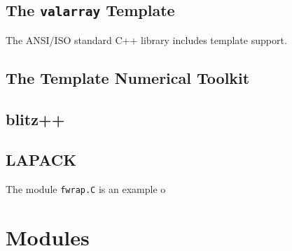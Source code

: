 \subsection{The \texttt{valarray} Template}

The ANSI/ISO standard C++ library includes template support.

\subsection{The Template Numerical Toolkit}

\subsection{blitz++}

\subsection{LAPACK}
The module \texttt{fwrap.C} is an example o


\section{Modules}

